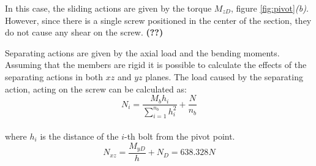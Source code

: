 In this case, the sliding actions are given by the torque $M_{zD}$,  figure \ref{fig:pivot}\textit{(b)}. However, since there is a single screw positioned in the center of the section, they do not cause any shear on the screw. \textbf{(??)}

Separating actions are given by the axial load and the bending moments. Assuming that the members are rigid it is possible to calculate the effects of the separating actions in both $xz$ and $yz$ planes. The load caused by the separating action, acting on the screw can be calculated as:
\begin{equation*}
    N_{i} = \frac{M_{b}h_{i}}{\sum\limits_{i=1}^{n_{b}} h^2_{i}} + \frac{N}{n_{b}}
\end{equation*}\\
where $h_{i}$ is the distance of the $i$-th bolt from the pivot point.
\begin{equation*}
    N_{xz} = \frac{M_{yD}}{h} + N_{D} = 638.328 N
\end{equation*}

